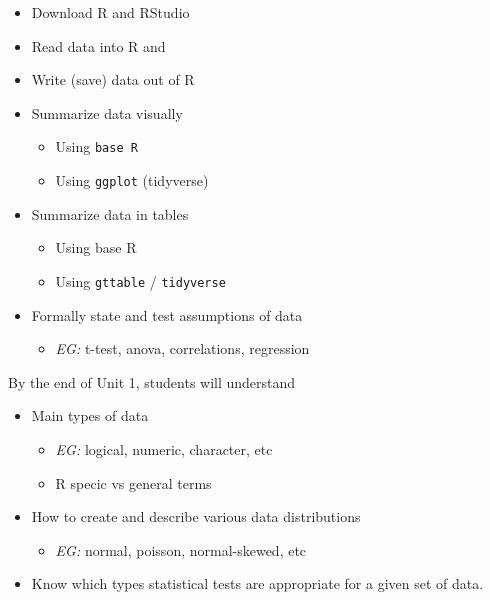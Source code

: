 \documentclass[
]{book}
\providecommand{\tightlist}{%
  \setlength{\itemsep}{0pt}\setlength{\parskip}{0pt}}
\begin{document}
\begin{itemize}
\tightlist
\item
  Download R and RStudio
\item
  Read data into R and
\item
  Write (save) data out of R
\item
  Summarize data visually

  \begin{itemize}
  \tightlist
  \item
    Using \texttt{base\ R}
  \item
    Using \texttt{ggplot} (tidyverse)
  \end{itemize}
\item
  Summarize data in tables

  \begin{itemize}
  \tightlist
  \item
    Using base R
  \item
    Using \texttt{gttable} / \texttt{tidyverse}
  \end{itemize}
\item
  Formally state and test assumptions of data

  \begin{itemize}
  \tightlist
  \item
    \emph{EG:} t-test, anova, correlations, regression
  \end{itemize}
\end{itemize}

By the end of Unit 1, students will understand

\begin{itemize}
\tightlist
\item
  Main types of data

  \begin{itemize}
  \tightlist
  \item
    \emph{EG:} logical, numeric, character, etc
  \item
    R specic vs general terms
  \end{itemize}
\item
  How to create and describe various data distributions

  \begin{itemize}
  \tightlist
  \item
    \emph{EG:} normal, poisson, normal-skewed, etc
  \end{itemize}
\item
  Know which types statistical tests are appropriate for a given set of data.
\end{itemize}
\end{document}
